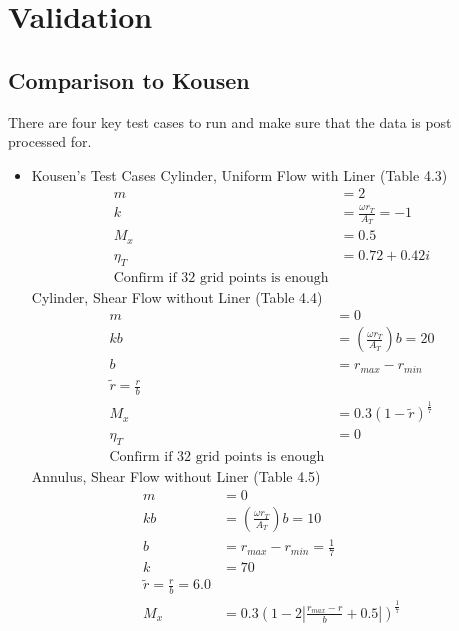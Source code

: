 \documentclass[12pt]{uthesis-v12}  %
\begin{document}
    \section{Validation}
    \subsection{Comparison to Kousen}



There are four key test cases to run and make sure that the data is post processed 
for.
\begin{itemize}
    \item Kousen's Test Cases
        \subitem Cylinder, Uniform Flow with Liner (Table 4.3)
        \begin{align*}
            m &= 2 \\
            k &= \frac{\omega r_T}{A_T} = -1 \\
            M_x &= 0.5 \\
            \eta_T &= 0.72 + 0.42i\\
            \text{Confirm if 32 grid points is enough}
        \end{align*} 
        \subitem Cylinder, Shear Flow without Liner (Table 4.4)
        \begin{align*}
            m &= 0 \\
            kb &= \left(\frac{\omega r_T}{A_T}\right)b = 20 \\
            b &= r_{max} - r_{min} \\
            \tilde{r} = \frac{r}{b} \\
            M_x &= 0.3(1-\tilde{r})^{\frac{1}{7}} \\
            \eta_T &= 0\\
            \text{Confirm if 32 grid points is enough}
        \end{align*}
        \subitem Annulus, Shear Flow without Liner (Table 4.5)
        \begin{align*}
            m &= 0 \\
            kb &= \left(\frac{\omega r_T}{A_T}\right)b = 10 \\
            b &= r_{max} - r_{min}  = \frac{1}{7}\\
            k &= 70 \\
            \tilde{r} = \frac{r}{b} = 6.0 \\
            M_x &= 0.3\left(1 - 2 \left| \frac{r_{max}-r}{b} + 0.5 \right|  \right)^{\frac{1}{7}} \\

\end{align*}
\end{itemize}
\end{document}
